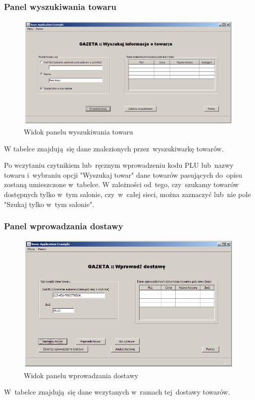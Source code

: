 \subsubsection{Panel wyszukiwania towaru}
\begin{figure}
\includegraphics[width=1\textwidth]{gfx/wyszukaj_produkt.png}
\caption{Widok panelu wyszukiwania towaru}
\end{figure}
W tabelce znajdują~się dane znalezionych przez~wyszukiwarkę towarów.

Po wczytaniu czytnikiem lub~ręcznym wprowadzeniu kodu PLU lub~nazwy towaru i~wybraniu opcji "Wyszukaj towar" dane towarów pasujących do~opisu zostaną umieszczone w~tabelce.
W zależności od~tego, czy~szukamy towarów dostępnych tylko w~tym salonie, czy~w~całej sieci, można zaznaczyć lub~nie pole "Szukaj tylko w~tym salonie".
\subsubsection{Panel wprowadzania dostawy}
\begin{figure}
\includegraphics[width=1\textwidth]{gfx/dostawa.png}
\caption{Widok panelu wprowadzania dostawy}
\end{figure}
W~tabelce znajdują~się dane wczytanych w~ramach tej~dostawy towarów.

